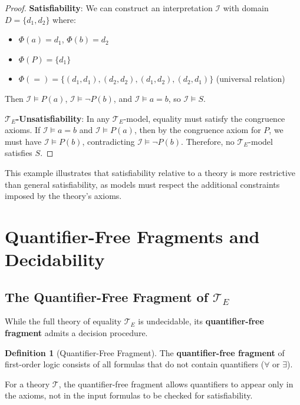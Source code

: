 \documentclass[11pt,a4paper]{article}
\theoremstyle{definition}
\newtheorem{definition}{Definition}[section]
\theoremstyle{plain}
\theoremstyle{remark}
\begin{document}
\begin{proof}
\textbf{Satisfiability}: We can construct an interpretation $\mathcal{I}$ with domain $D = \{d_1, d_2\}$ where:
\begin{itemize}
    \item $\Phi(a) = d_1$, $\Phi(b) = d_2$
    \item $\Phi(P) = \{d_1\}$
    \item $\Phi(=) = \{(d_1, d_1), (d_2, d_2), (d_1, d_2), (d_2, d_1)\}$ (universal relation)
\end{itemize}
Then $\mathcal{I} \models P(a)$, $\mathcal{I} \models \neg P(b)$, and $\mathcal{I} \models a = b$, so $\mathcal{I} \models S$.

\textbf{$\mathcal{T}_E$-Unsatisfiability}: In any $\mathcal{T}_E$-model, equality must satisfy the congruence axioms. If $\mathcal{I} \models a = b$ and $\mathcal{I} \models P(a)$, then by the congruence axiom for $P$, we must have $\mathcal{I} \models P(b)$, contradicting $\mathcal{I} \models \neg P(b)$. Therefore, no $\mathcal{T}_E$-model satisfies $S$.
\end{proof}

This example illustrates that satisfiability relative to a theory is more restrictive than general satisfiability, as models must respect the additional constraints imposed by the theory's axioms.

\section{Quantifier-Free Fragments and Decidability}

\subsection{The Quantifier-Free Fragment of $\mathcal{T}_E$}

While the full theory of equality $\mathcal{T}_E$ is undecidable, its \textbf{quantifier-free fragment} admits a decision procedure.

\begin{definition}[Quantifier-Free Fragment]
The \textbf{quantifier-free fragment} of first-order logic consists of all formulas that do not contain quantifiers ($\forall$ or $\exists$).

For a theory $\mathcal{T}$, the quantifier-free fragment allows quantifiers to appear only in the axioms, not in the input formulas to be checked for satisfiability.
\end{definition}
\end{document}

